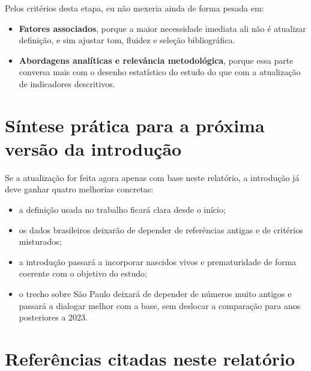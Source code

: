 \documentclass[12pt,a4paper]{article}
\begin{document}
Pelos critérios desta etapa, eu não mexeria ainda de forma pesada em:

\begin{itemize}
\item \textbf{Fatores associados}, porque a maior necessidade imediata ali não é atualizar definição, e sim ajustar tom, fluidez e seleção bibliográfica.
\item \textbf{Abordagens analíticas e relevância metodológica}, porque essa parte conversa mais com o desenho estatístico do estudo do que com a atualização de indicadores descritivos.
\end{itemize}

\section*{Síntese prática para a próxima versão da introdução}

Se a atualização for feita agora apenas com base neste relatório, a introdução já deve ganhar quatro melhorias concretas:

\begin{itemize}
\item a definição usada no trabalho ficará clara desde o início;
\item os dados brasileiros deixarão de depender de referências antigas e de critérios misturados;
\item a introdução passará a incorporar nascidos vivos e prematuridade de forma coerente com o objetivo do estudo;
\item o trecho sobre São Paulo deixará de depender de números muito antigos e passará a dialogar melhor com a base, sem deslocar a comparação para anos posteriores a 2023.
\end{itemize}

\section*{Referências citadas neste relatório}
\end{document}
